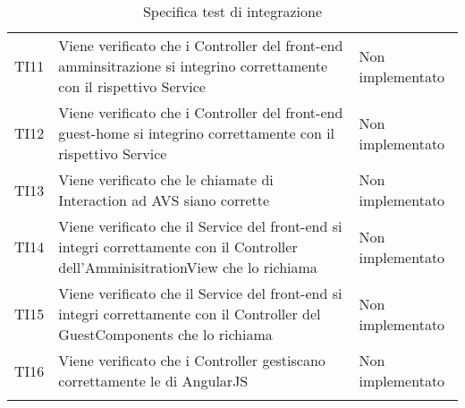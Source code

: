 \documentclass[../PianoDiQualifica.tex]{subfiles}
\begin{document}
\begin{longtable}[c] { >{\centering\arraybackslash}p{4cm} p{7cm} >{\centering\arraybackslash}p{4cm}}
			\addlinespace[0.3em]
			\midrule
			\addlinespace[0.3em]
			TI11 & Viene verificato che i Controller del front-end amminsitrazione si integrino correttamente con il rispettivo Service & Non implementato \\
			\addlinespace[0.3em]
			\midrule
			\addlinespace[0.3em]
			TI12 & Viene verificato che i Controller del front-end guest-home si integrino correttamente con il rispettivo Service & Non implementato \\
			\addlinespace[0.3em]
			\midrule
			\addlinespace[0.3em]
			TI13 & Viene verificato che le chiamate di Interaction ad AVS siano corrette & Non implementato \\
			\addlinespace[0.3em]
			\midrule
			\addlinespace[0.3em]
			TI14 & Viene verificato che il Service del front-end si integri correttamente con il Controller dell'AmminisitrationView che lo richiama & Non implementato \\
			\addlinespace[0.3em]
			\midrule
			\addlinespace[0.3em]
			TI15 & Viene verificato che il Service del front-end si integri correttamente con il Controller del GuestComponents che lo richiama & Non implementato \\
			\addlinespace[0.3em]
			\midrule
			\addlinespace[0.3em]
			TI16 & Viene verificato che i Controller gestiscano correttamente le \gl{root} di AngularJS & Non implementato \\
			\bottomrule
			\caption{Specifica test di integrazione}
	\end{longtable}
	
	\newpage
\end{document}
